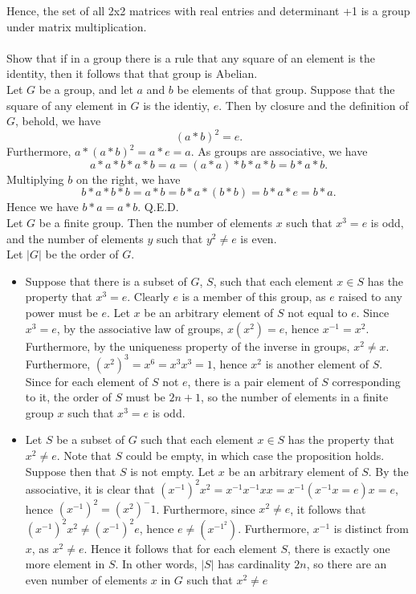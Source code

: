 \documentclass{article}
\begin{document}
Hence, the set of all 2x2 matrices with real entries and determinant +1 is a group under matrix multiplication. \\

\\
 Show that if in a group there is a rule that any square of an element is the identity, then it follows that that group is Abelian.\\

Let $G$ be a group, and let $a$ and $b$ be elements of that group. Suppose that the square of any element in $G$ is the identiy, $e$. Then by closure and the definition of $G$, behold, we have
$$(a*b)^2 = e.$$
Furthermore, $a*(a*b)^2 = a*e = a.$ As groups are associative, we have $$a*a*b*a*b = a = (a*a)*b*a*b = b*a*b.$$ Multiplying $b$ on the right, we have 
$$b*a*b*b = a*b = b*a*(b*b) = b*a*e = b*a.$$ Hence we have $b*a = a*b.$ Q.E.D.\\
\newpage
{} Let $G$ be a finite group. Then the number of elements $x$ such that $x^3 = e$ is odd, and the number of elements $y$ such that $y^2 \ne e$ is even.\\

 Let $|G|$ be the order of $G$. \\
\begin{itemize}
    \item Suppose that there is a subset of $G$, $S$, such that each element $x\in S$ has the property that $x^3 = e$. Clearly $e$ is a member of this group, as $e$ raised to any power must be $e$. Let $x$ be an arbitrary element of $S$ not equal to $e$. Since $x^3 = e$, by the associative law of groups, $x(x^2) = e$, hence $x^{-1} = x^2$. Furthermore, by the uniqueness property of the inverse in groups, $x^2 \ne x$. Furthermore, $(x^2)^3 = x^6 = x^3x^3 = 1$, hence $x^2$ is another element of $S$. Since for each element of $S$ not $e$, there is a pair element of $S$ corresponding to it, the order of $S$ must be $2n + 1$, so the number of elements in a finite group $x$ such that $x^3 = e$ is odd.
    \item Let $S$ be a subset of $G$ such that each element $x\in S$ has the property that $x^2 \ne e$. Note that $S$ could be empty, in which case the proposition holds. Suppose then that $S$ is not empty. Let $x$ be an arbitrary element of $S$. By the associative, it is clear that $(x^{-1})^2x^2 = x^{-1}x^{-1}xx = x^{-1}(x^{-1}x = e)x = e$, hence $(x^{-1})^2 = (x^2)^-1$. Furthermore, since $x^2 \ne e$, it follows that $(x^{-1})^2x^2 \ne (x^{-1})^2 e$, hence $e\ne (x^{-1}^2)$. Furthermore, $x^{-1}$ is distinct from $x$, as $x^2 \ne e$. Hence it follows that for each element $S$, there is exactly one more element in $S$. In other words, $|S|$ has cardinality $2n$, so there are an even number of elements $x$ in $G$ such that $x^2 \ne e$
\end{itemize}
\end{document}
